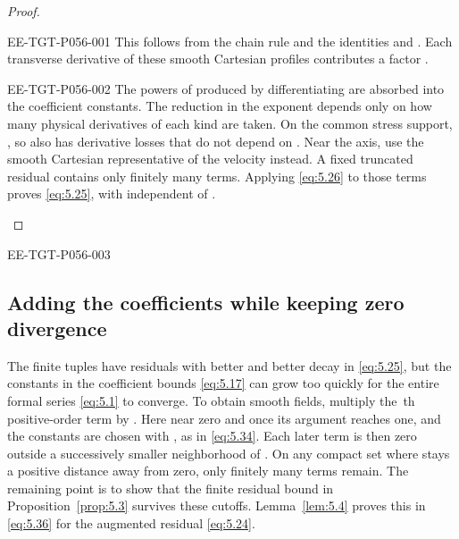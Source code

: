 \begin{proof}
%
\begin{EESegment}{EE-TGT-P056-001}
This follows from the chain rule and the identities
 and
. Each transverse
derivative of these smooth Cartesian profiles contributes a factor .
\end{EESegment}

\begin{EESegment}{EE-TGT-P056-002}
The powers of  produced by differentiating  are
absorbed into the coefficient constants. The reduction in the exponent depends only on how many physical derivatives of
each kind are taken. On the common stress support, , so
 also has derivative losses that do not depend on
. Near the axis, use the smooth Cartesian representative of the velocity instead. A fixed
truncated residual contains only finitely many terms. Applying \eqref{eq:5.26} to those terms proves \eqref{eq:5.25},
with  independent of .
\end{EESegment}
\end{proof}

\begin{EESegment}{EE-TGT-P056-003}
\subsection{Adding the coefficients while keeping zero divergence}\label{sec:5.4}
The finite tuples  have residuals with better and better decay in
\eqref{eq:5.25}, but the constants  in the coefficient bounds \eqref{eq:5.17} can grow too
quickly for the entire formal series \eqref{eq:5.1} to converge. To obtain smooth fields, multiply the
\,th positive-order term by . Here
 near zero and  once its argument reaches one, and the constants are chosen with
, as in \eqref{eq:5.34}. Each later term is then zero outside a successively smaller neighborhood
of . On any compact set where  stays a positive distance away from zero,
only finitely many terms remain. The remaining point is to show that the finite residual bound in
Proposition~\ref{prop:5.3} survives these cutoffs. Lemma~\ref{lem:5.4} proves this in \eqref{eq:5.36} for the augmented
residual \eqref{eq:5.24}.
\end{EESegment}

